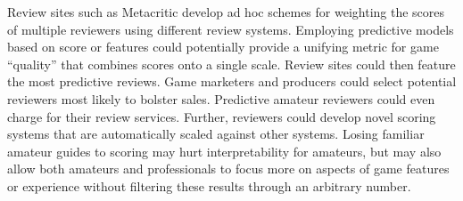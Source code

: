 \documentclass[letterpaper]{article}
\begin{document}
Review sites such as Metacritic develop ad hoc schemes for weighting the scores of multiple reviewers using different review systems. Employing predictive models based on score or features could potentially provide a unifying metric for game ``quality'' that combines scores onto a single scale. Review sites could then feature the most predictive reviews. Game marketers and producers could select potential reviewers most likely to bolster sales. Predictive amateur reviewers could even charge for their review services. Further, reviewers could develop novel scoring systems that are automatically scaled against other systems. Losing familiar amateur guides to scoring may hurt interpretability for amateurs, but may also allow both amateurs and professionals to focus more on aspects of game features or experience without filtering these results through an arbitrary number.


\end{document}
